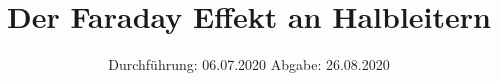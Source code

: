 

\subject{V 46}
\title{Der Faraday Effekt an Halbleitern}
\date{%
  Durchführung: 06.07.2020
  \hspace{3em}
  Abgabe: 26.08.2020
}



\maketitle
\thispagestyle{empty}
\tableofcontents
\newpage






\printbibliography{}


